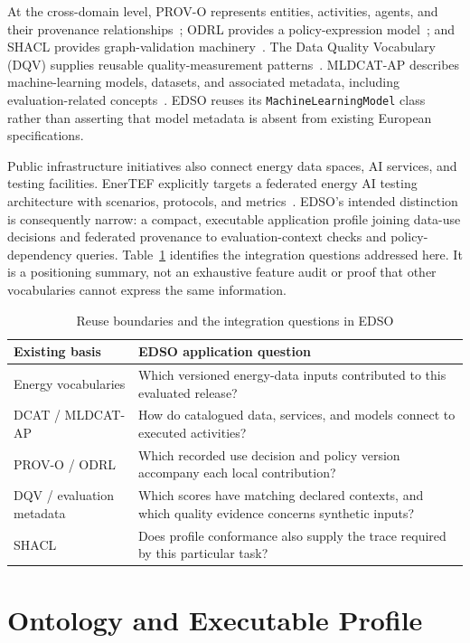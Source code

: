 \documentclass[conference]{IEEEtran}
\newcommand{\term}[1]{\texttt{#1}}
\begin{document}
At the cross-domain level, PROV-O represents entities, activities, agents, and their provenance relationships~\cite{prov}; ODRL provides a policy-expression model~\cite{odrl}; and SHACL provides graph-validation machinery~\cite{shacl}. The Data Quality Vocabulary (DQV) supplies reusable quality-measurement patterns~\cite{dqv}. MLDCAT-AP describes machine-learning models, datasets, and associated metadata, including evaluation-related concepts~\cite{mldcat}. EDSO reuses its \term{MachineLearningModel} class rather than asserting that model metadata is absent from existing European specifications.

Public infrastructure initiatives also connect energy data spaces, AI services, and testing facilities. EnerTEF explicitly targets a federated energy AI testing architecture with scenarios, protocols, and metrics~\cite{enertef}. EDSO's intended distinction is consequently narrow: a compact, executable application profile joining data-use decisions and federated provenance to evaluation-context checks and policy-dependency queries. Table~\ref{tab:position} identifies the integration questions addressed here. It is a positioning summary, not an exhaustive feature audit or proof that other vocabularies cannot express the same information.

\begin{table}[t]
\caption{Reuse boundaries and the integration questions in EDSO}
\label{tab:position}
\centering\small
\begin{tabular}{@{}p{}p{}@{}}
\toprule
Existing basis & EDSO application question \\
\midrule
Energy vocabularies & Which versioned energy-data inputs contributed to this evaluated release? \\
DCAT / MLDCAT-AP & How do catalogued data, services, and models connect to executed activities? \\
PROV-O / ODRL & Which recorded use decision and policy version accompany each local contribution? \\
DQV / evaluation metadata & Which scores have matching declared contexts, and which quality evidence concerns synthetic inputs? \\
SHACL & Does profile conformance also supply the trace required by this particular task? \\
\bottomrule
\end{tabular}
\end{table}

\section{Ontology and Executable Profile}
\end{document}
